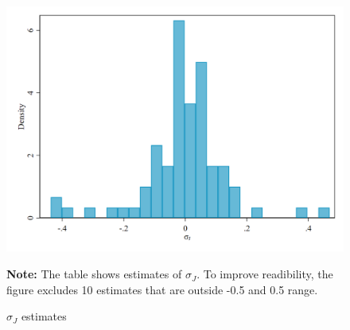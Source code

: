 \begin{figure}[!h]
\centering
\caption{$\sigma_J$ estimates}
\label{fig:sigma_estimates}
\includegraphics[width=1\textwidth]{figures//sigma_estimates}
\par \begin{minipage}[h]{\textwidth}{\scriptsize\textbf{Note:} The table shows estimates of $\sigma_J$. To improve readibility, the figure excludes 10 estimates that are outside -0.5 and 0.5 range.}\end{minipage}
\end{figure}
